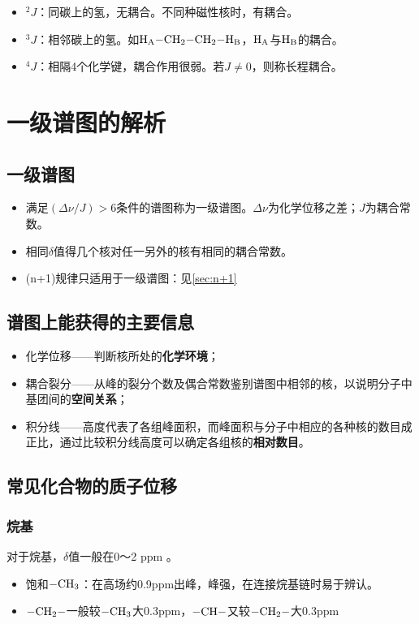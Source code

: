 \begin{itemize}
	\item $^{2}J$：同碳上的氢，无耦合。不同种磁性核时，有耦合。
	\item $^{3}J$：相邻碳上的氢。如$\ce{H_A-CH2-CH2-H_B}$，$\ce{H_A}$与$\ce{H_B}$的耦合。
	\item $^{4}J$：相隔4个化学键，耦合作用很弱。若$J\neq 0$，则称长程耦合。
\end{itemize}

\section{一级谱图的解析}

\subsection{一级谱图}
\begin{itemize}
	\item 满足$(\Delta \nu/J)>6$条件的谱图称为一级谱图。$\Delta \nu$为化学位移之差；$J$为耦合常数。
	\item 相同$\delta$值得几个核对任一另外的核有相同的耦合常数。
	\item (n+1)规律只适用于一级谱图：见\ref{sec:n+1}
\end{itemize}

\subsection{谱图上能获得的主要信息}
\begin{itemize}
	\item 化学位移——判断核所处的\textbf{化学环境}；
	\item 耦合裂分——从峰的裂分个数及偶合常数鉴别谱图中相邻的核，以说明分子中基团间的\textbf{空间关系}；
	\item 积分线——高度代表了各组峰面积，而峰面积与分子中相应的各种核的数目成正比，通过比较积分线高度可以确定各组核的\textbf{相对数目}。
\end{itemize}

\subsection{常见化合物的质子位移}

\subsubsection{烷基}
对于烷基，$\delta$值一般在0～2 ppm 。
\begin{itemize}
	\item 饱和$\ce{-CH3}$：在高场约0.9ppm出峰，峰强，在连接烷基链时易于辨认。
	\item $\ce{-CH2-}$一般较$\ce{-CH3}$大0.3ppm，$\ce{-CH-}$又较$\ce{-CH2-}$大0.3ppm
\end{itemize}

